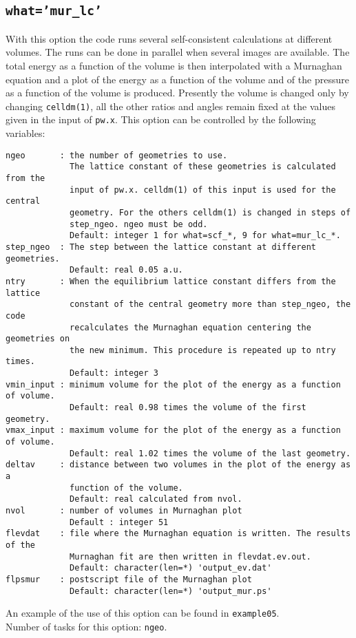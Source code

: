 \documentclass[12pt,a4paper]{article}
\begin{document}
\subsection{\texttt{what='mur\_lc'}}
With this option the code runs several self-consistent calculations
at different volumes. The runs can be done in parallel when several images 
are available. The total energy as a function of the volume is then 
interpolated with a Murnaghan equation and a plot of the energy
as a function of the volume and of the pressure as a function of the volume is
produced. Presently the volume is changed only by changing \texttt{celldm(1)},
all the other ratios and angles remain fixed at the values given in
the input of \texttt{pw.x}. 
This option can be controlled by the following variables:
\begin{verbatim}
ngeo       : the number of geometries to use.
             The lattice constant of these geometries is calculated from the
             input of pw.x. celldm(1) of this input is used for the central
             geometry. For the others celldm(1) is changed in steps of 
             step_ngeo. ngeo must be odd.
             Default: integer 1 for what=scf_*, 9 for what=mur_lc_*.
step_ngeo  : The step between the lattice constant at different geometries.
             Default: real 0.05 a.u.
ntry       : When the equilibrium lattice constant differs from the lattice 
             constant of the central geometry more than step_ngeo, the code 
             recalculates the Murnaghan equation centering the geometries on 
             the new minimum. This procedure is repeated up to ntry times.
             Default: integer 3
vmin_input : minimum volume for the plot of the energy as a function of volume.
             Default: real 0.98 times the volume of the first geometry.
vmax_input : maximum volume for the plot of the energy as a function of volume.
             Default: real 1.02 times the volume of the last geometry.
deltav     : distance between two volumes in the plot of the energy as a 
             function of the volume.
             Default: real calculated from nvol.
nvol       : number of volumes in Murnaghan plot
             Default : integer 51
flevdat    : file where the Murnaghan equation is written. The results of the
             Murnaghan fit are then written in flevdat.ev.out.
             Default: character(len=*) 'output_ev.dat'
flpsmur    : postscript file of the Murnaghan plot
             Default: character(len=*) 'output_mur.ps'
\end{verbatim}
An example of the use of this option can be found in \texttt{example05}.\\
Number of tasks for this option: \texttt{ngeo}.
\end{document}
